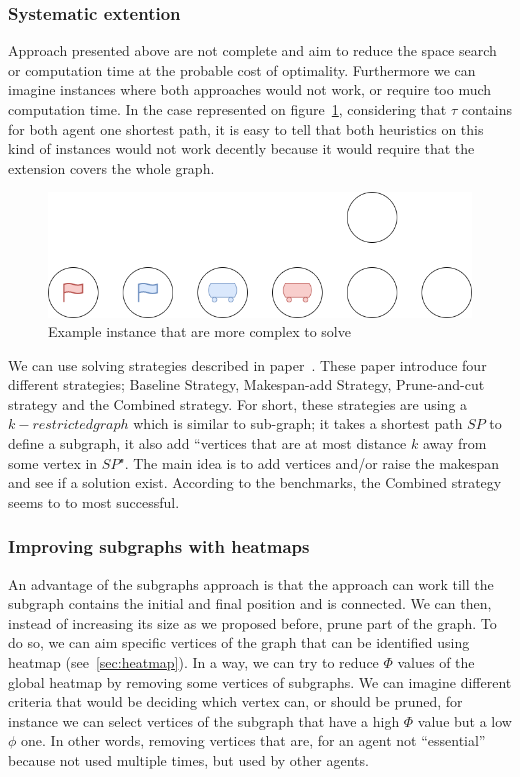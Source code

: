 \subsubsection{Systematic extention}

Approach presented above are not complete and aim to reduce the space search or computation time at the probable cost of optimality. Furthermore we can imagine instances where both approaches would not work, or require too much computation time. In the case represented on figure~\ref{img:systemetic_instance}, considering that \(\tau\) contains for both agent one shortest path, it is easy to tell that both heuristics on this kind of instances would not work decently because it would require that the extension covers the whole graph.

\begin{figure}[H]
  \centering
  \caption{Example instance that are more complex to solve}\label{img:systemetic_instance}
  \includegraphics[width=\widthimg]{img/systematic_instance.drawio.png}
\end{figure}

We can use solving strategies described in paper~\cite{husvobbass22a,husvobbass22b}. These paper introduce four different strategies; Baseline Strategy, Makespan-add Strategy, Prune-and-cut strategy and the Combined strategy. For short, these strategies are using a \(k-restricted graph\) which is similar to sub-graph; it takes a shortest path \(SP\) to define a subgraph, it also add ``vertices that are at most distance \(k\) away from some vertex in \(SP\)". The main idea is to add vertices and/or raise the makespan and see if a solution exist. According to the benchmarks, the Combined strategy seems to to most successful.

\subsubsection{Improving subgraphs with heatmaps}

An advantage of the subgraphs approach is that the approach can work till the subgraph contains the initial and final position and is connected. We can then, instead of increasing its size as we proposed before, prune part of the graph. To do so, we can aim specific vertices of the graph that can be identified using heatmap (see~\ref{sec:heatmap}). In a way, we can try to reduce \(\Phi\) values of the global heatmap by removing some vertices of subgraphs. We can imagine different criteria that would be deciding which vertex can, or should be pruned, for instance we can select vertices of the subgraph that have a high \(\Phi\) value but a low \(\phi\) one. In other words, removing vertices that are, for an agent not ``essential'' because not used multiple times, but used by other agents. 

